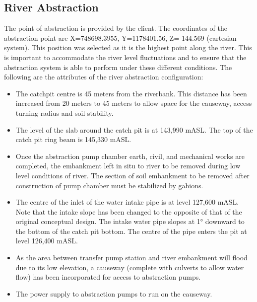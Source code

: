 \documentclass{article}%
\begin{document}
\subsection{River Abstraction}%
\label{subsec:RiverAbstraction}%
The point of abstraction is provided by the client. The coordinates of the abstraction point are X=748698.3955, Y=1178401.56, Z= 144.569 (cartesian system). This position was selected as it is the highest point along the river. This is important to accommodate the river level fluctuations and to ensure that the abstraction system is able to perform under these different conditions.%
\newline%
%
\newline%
%
 The following are the attributes of the river abstraction configuration:%
\begin{itemize}%
\item%
The catchpit centre is 45 meters from the riverbank. This distance has been increased from 20 meters to 45 meters to allow space for the causeway, access turning radius and soil stability.%
\item%
The level of the slab around the catch pit is at 143,990 mASL. The top of the catch pit ring beam is 145,330 mASL.%
\item%
Once the abstraction pump chamber earth, civil, and mechanical works are completed, the embankment left in situ to river to be removed during low level conditions of river. The section of soil embankment to be removed after construction of pump chamber must be stabilized by gabions.%
\item%
The centre of the inlet of the water intake pipe is at level 127,600 mASL. Note that the intake slope has been changed to the opposite of that of the original conceptual design. The intake water pipe slopes at 1° downward to the bottom of the catch pit bottom. The centre of the pipe enters the pit at level 126,400 mASL.%
\item%
As the area between transfer pump station and river embankment will flood due to its low elevation, a causeway (complete with culverts to allow water flow) has been incorporated for access to abstraction pumps.%
\item%
The power supply to abstraction pumps to run on the causeway.%
\end{itemize}

%
\end{document}
